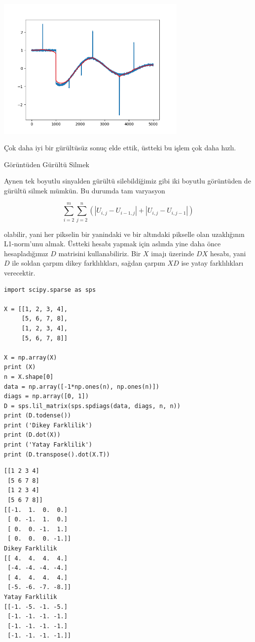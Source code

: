 \documentclass[12pt,fleqn]{article}\usepackage{../../common}
\begin{document}
\includegraphics[width=25em]{func_60_tvd_03.png}

Çok daha iyi bir gürültüsüz sonuç elde ettik, üstteki bu işlem çok daha
hızlı. 

Görüntüden Gürültü Silmek

Aynen tek boyutlu sinyalden gürültü silebildiğimiz gibi iki boyutlu
görüntüden de gürültü silmek mümkün. Bu durumda tam varyasyon 

$$
\sum_{i=2}^{m} \sum_{j=2}^{n} (|U_{i,j} - U_{i-1,j}| + |U_{i,j} - U_{i,j-1}|)
$$

olabilir, yani her pikselin bir yanindaki ve bir altındaki pikselle olan
uzaklığının L1-norm'unu almak. Üstteki hesabı yapmak için aslında yine daha
önce hesapladığımız $D$ matrisini kullanabiliriz. Bir $X$ imajı üzerinde
$DX$ hesabı, yani $D$ ile soldan çarpım dikey farklılıkları, sağdan çarpım
$XD$ ise yatay farklılıkları verecektir.

\begin{verbatim}
import scipy.sparse as sps

X = [[1, 2, 3, 4],
     [5, 6, 7, 8],
     [1, 2, 3, 4],
     [5, 6, 7, 8]]

X = np.array(X)
print (X)
n = X.shape[0]
data = np.array([-1*np.ones(n), np.ones(n)])
diags = np.array([0, 1])
D = sps.lil_matrix(sps.spdiags(data, diags, n, n))
print (D.todense())
print ('Dikey Farklilik')
print (D.dot(X))
print ('Yatay Farklilik')
print (D.transpose().dot(X.T))
\end{verbatim}

\begin{verbatim}
[[1 2 3 4]
 [5 6 7 8]
 [1 2 3 4]
 [5 6 7 8]]
[[-1.  1.  0.  0.]
 [ 0. -1.  1.  0.]
 [ 0.  0. -1.  1.]
 [ 0.  0.  0. -1.]]
Dikey Farklilik
[[ 4.  4.  4.  4.]
 [-4. -4. -4. -4.]
 [ 4.  4.  4.  4.]
 [-5. -6. -7. -8.]]
Yatay Farklilik
[[-1. -5. -1. -5.]
 [-1. -1. -1. -1.]
 [-1. -1. -1. -1.]
 [-1. -1. -1. -1.]]
\end{verbatim}
\end{document}
